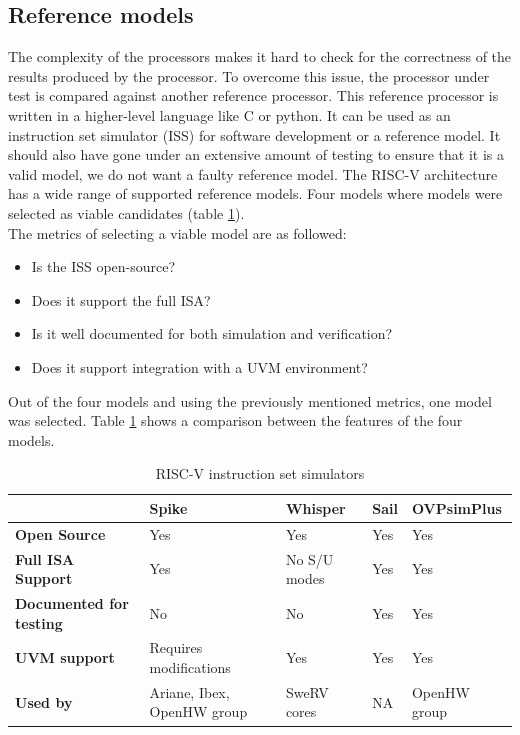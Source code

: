 \documentclass[../main.tex]{subfiles}
\begin{document}
\subsection{Reference models}
The complexity of the processors makes it hard to check for the correctness of the results produced by the processor. To overcome this issue, the processor under test is compared against another reference processor. This reference processor is written in a higher-level language like C or python. It can be used as an instruction set simulator (ISS) for software development or a reference model. It should also have gone under an extensive amount of testing to ensure that it is a valid model, we do not want a faulty reference model. The RISC-V architecture has a wide range of supported reference models. Four models where models were selected as viable candidates (table \ref{UVM.ISS}).\\
\newline
\noindent The metrics of selecting a viable model are as followed:
\begin{itemize}
    \item Is the ISS open-source?
    \item Does it support the full ISA?
    \item Is it well documented for both simulation and verification?
    \item Does it support integration with a UVM environment?
\end{itemize}

\noindent Out of the four models and using the previously mentioned metrics, one model was selected. Table \ref{UVM.ISS} shows a comparison between the features of the four models.
\newpage

\begin{table}[h!]
\begin{center}
\begin{tabular}{p{3cm} | p{2.8cm} | p{2.5cm} | p{1.5cm} | p{2.7cm} |}
    & \textbf{Spike}&\textbf{Whisper} & \textbf{Sail} & \textbf{OVPsimPlus}\\
    \hline
    \textbf{Open Source}& Yes& Yes & Yes & Yes\\ 
    \hline
	\textbf{Full ISA Support}& Yes& No S/U modes & Yes & Yes\\
	\hline
	\textbf{Documented for testing}& No& No & Yes & Yes\\
	\hline
	\textbf{UVM support} & Requires modifications& Yes & Yes & Yes\\
	\hline
	\textbf{Used by}& Ariane, Ibex, OpenHW group & SweRV cores & NA & OpenHW group\\
	\hline
\end{tabular}
\end{center}
\caption{RISC-V instruction set simulators }
\label{UVM.ISS}
\end{table}
\end{document}
